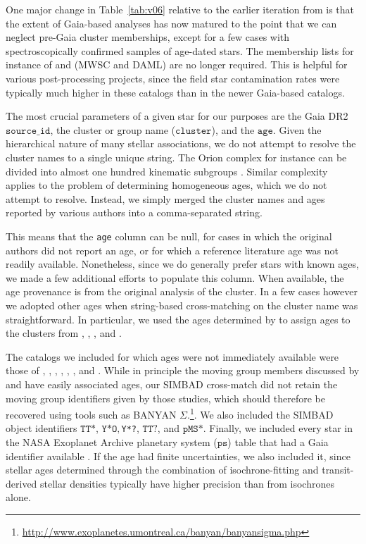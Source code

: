 \documentclass[12pt,modern,twocolumn,tighten]{aastex63}
\begin{document}
One major change in Table~\ref{tab:v06} relative to the earlier
iteration from \citet{bouma_cdipsI_2019} is that the extent of Gaia-based
analyses has now matured to the point that we can neglect pre-Gaia
cluster memberships, except for a few cases with spectroscopically
confirmed samples of age-dated stars.  The membership lists for
instance of \citet{Kharchenko_et_al_2013} and \citet{dias_proper_2014}
(MWSC and DAML) are no longer required.  This is helpful for various
post-processing projects,  since the field star contamination rates
were typically much higher in these catalogs than in the newer
Gaia-based catalogs.

The most crucial parameters of a given star for our purposes are the
Gaia DR2 $\texttt{source\_id}$, the cluster or
group name ($\texttt{cluster}$), and the $\texttt{age}$.  Given the
hierarchical nature of many stellar associations, we do not attempt to
resolve the cluster names to a single unique string.  The Orion
complex for instance can be divided into almost one hundred kinematic
subgroups \citep{kounkel_apogee2_2018}.  Similar complexity applies to
the problem of determining homogeneous ages, which we do not attempt
to resolve.  Instead, we simply merged the cluster names and ages
reported by various authors into a comma-separated string.

This means that the \texttt{age} column can be null, for cases in
which the original authors did not report an age, or for which a reference
literature age was not readily available.  Nonetheless, since we do
generally prefer stars with known ages, we made a few additional
efforts to populate this column.  When available, the age provenance
is from the original analysis of the cluster.  In a few cases
however we adopted other ages when string-based cross-matching on the
cluster name was straightforward.  In particular, we used the ages
determined by \citet{CantatGaudin2020b} to assign ages to the clusters
from \citet{GaiaCollaboration2018}, \citet{CantatGaudin2018a},
\citet{CastroGinard2020}, and \citet{CantatGaudin2020a}.

The catalogs we included for which ages were not immediately available
were those of \citet{CottenSong2016}, \citet{Oh2017},
\citet{Zari2018}, \citet{Gagne2018b}, \citet{Gagne2018a},
\citet{Gagne2018c}, and \citet{Ujjwal2020}.  While in principle the
moving group members discussed by
\citet{Gagne2018b,Gagne2018a,Gagne2018c} and \citet{Ujjwal2020} have
easily associated ages, our SIMBAD cross-match did not retain the
moving group identifiers given by those studies, which should
therefore be recovered using tools such as BANYAN
$\Sigma$.\footnote{\url{http://www.exoplanetes.umontreal.ca/banyan/banyansigma.php}}.
We also included the SIMBAD object identifiers $\texttt{TT*}$,
$\texttt{Y*O}, $\texttt{Y*?}, $\texttt{TT?}$, and $\texttt{pMS*}$.
Finally, we  included every star in the NASA Exoplanet Archive
planetary system ($\texttt{ps}$) table that had a Gaia identifier
available \citep{NASAExoArchive_ps_20210506}.  If the age had finite
uncertainties, we also included it, since stellar ages determined
through the combination of isochrone-fitting and transit-derived
stellar densities typically have higher precision than from isochrones
alone.
\end{document}
